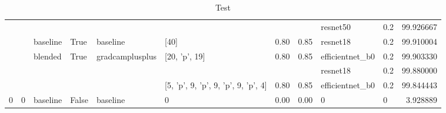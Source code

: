 \begin{table}[]
{\begin{tabular}{llllllllllr}
  &   &          &       &          &   &      &      & resnet50 & 0.2 &  99.926667 \\
  &   & baseline & True  & baseline & [40] & 0.80 & 0.85 & resnet18 & 0.2 &  99.910004 \\
  &   & blended & True  & gradcamplusplus & [20, 'p', 19] & 0.80 & 0.85 & efficientnet\_b0 & 0.2 &  99.903330 \\
  &   &          &       &          &   &      &      & resnet18 & 0.2 &  99.880000 \\
  &   &          &       &          & [5, 'p', 9, 'p', 9, 'p', 9, 'p', 4] & 0.80 & 0.85 & efficientnet\_b0 & 0.2 &  99.844443 \\
0 & 0 & baseline & False & baseline & 0 & 0.00 & 0.00 & 0 & 0 &   3.928889 \\
\bottomrule
\end{tabular}

}
\caption{Test}
\label{test}
\end{table}